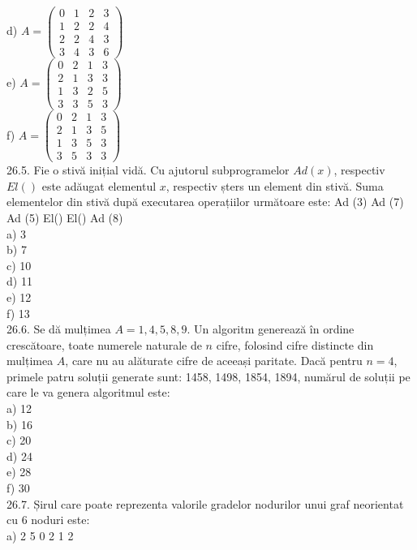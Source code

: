 {{\\
d) $A=\left(\begin{array}{llll}0 & 1 & 2 & 3 \\ 1 & 2 & 2 & 4 \\ 2 & 2 & 4 & 3 \\ 3 & 4 & 3 & 6\end{array}\right)$
\\
e) $A=\left(\begin{array}{llll}0 & 2 & 1 & 3 \\ 2 & 1 & 3 & 3 \\ 1 & 3 & 2 & 5 \\ 3 & 3 & 5 & 3\end{array}\right)$
\\
f) $A=\left(\begin{array}{llll}0 & 2 & 1 & 3 \\ 2 & 1 & 3 & 5 \\ 1 & 3 & 5 & 3 \\ 3 & 5 & 3 & 3\end{array}\right)$
\\
26.5. Fie o stivă inițial vidă. Cu ajutorul subprogramelor $Ad(x)$, respectiv $El()$ este adăugat elementul $x$, respectiv șters un element din stivă. Suma elementelor din stivă după executarea operațiilor următoare este: Ad (3) Ad (7) Ad (5) El() El() Ad (8)
\\
a) 3
\\
b) 7
\\
c) 10
\\
d) 11
\\
e) 12
\\
f) 13
\\
26.6. Se dă mulțimea $A={1,4,5,8,9}$. Un algoritm generează în ordine crescătoare, toate numerele naturale de $n$ cifre, folosind cifre distincte din mulțimea $A$, care nu au alăturate cifre de aceeași paritate. Dacă pentru $n=4$, primele patru soluții generate sunt: 1458, 1498, 1854, 1894, numărul de soluții pe care le va genera algoritmul este:
\\
a) 12
\\
b) 16
\\
c) 20
\\
d) 24
\\
e) 28
\\
f) 30
\\
26.7. Șirul care poate reprezenta valorile gradelor nodurilor unui graf neorientat cu 6 noduri este:
\\
a) 2 5 0 2 1 2
\\
}}
